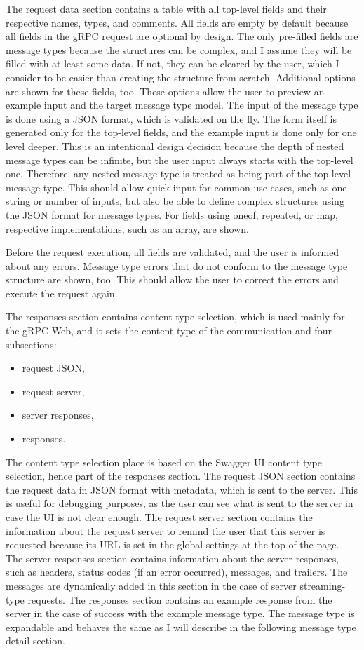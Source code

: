 The request data section contains a table with all top-level fields and their respective names, types, and comments.
All fields are empty by default because all fields in the gRPC request are optional by design.
The only pre-filled fields are message types because the structures can be complex, and I assume they will be filled with at least some data.
If not, they can be cleared by the user, which I consider to be easier than creating the structure from scratch.
Additional options are shown for these fields, too.
These options allow the user to preview an example input and the target message type model.
The input of the message type is done using a JSON format, which is validated on the fly.
The form itself is generated only for the top-level fields, and the example input is done only for one level deeper.
This is an intentional design decision because the depth of nested message types can be infinite, but the user input always starts with the top-level one.
Therefore, any nested message type is treated as being part of the top-level message type.
This should allow quick input for common use cases, such as one string or number of inputs, but also be able to define complex structures using the JSON format for message types.
For fields using oneof, repeated, or map, respective implementations, such as an array, are shown.

Before the request execution, all fields are validated, and the user is informed about any errors.
Message type errors that do not conform to the message type structure are shown, too.
This should allow the user to correct the errors and execute the request again.

The responses section contains content type selection, which is used mainly for the gRPC-Web, and it sets the content type of the communication and four subsections:
\begin{itemize}
    \item request JSON,
    \item request server,
    \item server responses,
    \item responses.
\end{itemize}

The content type selection place is based on the Swagger UI content type selection, hence part of the responses section.
The request JSON section contains the request data in JSON format with metadata, which is sent to the server.
This is useful for debugging purposes, as the user can see what is sent to the server in case the UI is not clear enough.
The request server section contains the information about the request server to remind the user that this server is requested because its URL is set in the global settings at the top of the page.
The server responses section contains information about the server responses, such as headers, status codes (if an error occurred), messages, and trailers.
The messages are dynamically added in this section in the case of server streaming-type requests.
The responses section contains an example response from the server in the case of success with the example message type.
The message type is expandable and behaves the same as I will describe in the following message type detail section.


